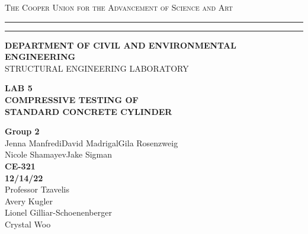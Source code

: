 \begin{titlepage}
    \begin{center}
    {{\Large{\textsc{The Cooper Union for the Advancement of Science and Art}}}} \rule[0.1cm]{15.8cm}{0.1mm}
    \rule[0.5cm]{15.8cm}{0.6mm}
    {\small{\bf DEPARTMENT OF CIVIL AND ENVIRONMENTAL ENGINEERING}}\\
    {\footnotesize{STRUCTURAL ENGINEERING LABORATORY}}
    \end{center}
    \vspace{15mm}
    \begin{center}
    {\large{\bf LAB 5\\}}
    \vspace{5mm}
    {\Large{\bf COMPRESSIVE TESTING OF\\}}
    \vspace{2mm}
    {\Large{\bf STANDARD CONCRETE CYLINDER}}
    \end{center}
    \vspace{35mm}
    \par
    \noindent
    \hfill
    \vspace{20mm}
    \begin{center}
    {\large{ {\bf Group 2} \\ { Jenna Manfredi\hspace{5mm}David Madrigal\hspace{5mm}Gila Rosenzweig\\Nicole Shamayev\hspace{5mm}Jake Sigman}}}
    \vspace{40mm}
    {\large {\bf \\CE-321 \\ 12/14/22 \\}}
    \vspace{15mm}
    {\normalsize{Professor Tzavelis \\ Avery Kugler \\ Lionel Gilliar-Schoenenberger \\ Crystal Woo}}
    \end{center}
\end{titlepage}